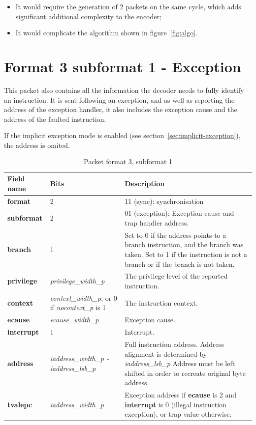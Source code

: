 \begin{itemize}
  \item It would require the generation of 2 packets on the same cycle, which adds significant additional complexity
    to the encoder;
  \item It would complicate the algorithm shown in figure~\ref{fig:algo}. 
\end{itemize}

\FloatBarrier
\section{Format 3 subformat 1 - Exception} \label{sec:format31}

This packet also contains all the information the decoder needs to fully identify an instruction.
It is sent following an exception, and as well as reporting the address of the exception handler, it also 
includes the exception cause and the address of the faulted instruction.

If the implicit exception mode is enabled (see section~\ref{sec:implicit-exception}), the address is omited.

\begin{table}[htp]
  \centering
  \caption{Packet format 3, subformat 1}
  \label{tab:te_inst3-1}
  \begin{tabulary}{\textwidth}{|l|p{35mm}|p{90mm}|}
    \hline
    {\bf Field name} & {\bf Bits} & {\bf Description} \\
    \hline
    \textbf{format} & 2 & 11 (sync): synchronisation\\
    \hline
    \textbf{subformat} & 2 & 01 (exception): Exception cause and trap handler address.\\
    \hline
    \textbf{branch} & 1 & Set to 0 if the address points to a branch instruction, and the branch was taken.  
              Set to 1 if the instruction is not a branch or if the branch is not taken. \\
    \hline
    \textbf{privilege} & \textit {privilege\_width\_p} & 
                The privilege level of the reported instruction.\\
    \hline
    \textbf{context} &  \textit {context\_width\_p}, 
               or 0 if \textit {nocontext\_p} is 1 & 
               The instruction context. \\
    \hline
    \textbf{ecause} & \textit {ecause\_width\_p} & 
             Exception cause. \\
    \hline
    \textbf{interrupt} & 1 & 
                Interrupt. \\
    \hline
    \textbf{address} & \textit {iaddress\_width\_p - iaddress\_lsb\_p} & 
              Full instruction address.  Address alignment is determined by \textit {iaddress\_lsb\_p} Address must be left shifted in order to recreate original byte address. \\
    \hline
    \textbf{tvalepc} & \textit {iaddress\_width\_p} & 
           Exception address if \textbf{ecause} is 2 and \textbf{interrupt} is 0 (illegal instruction exception), or trap value otherwise.\\
    \hline
  \end{tabulary}
\end{table}

